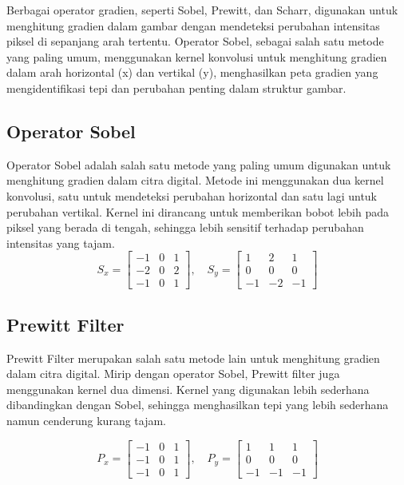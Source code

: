   Berbagai operator gradien, seperti Sobel, Prewitt, dan Scharr, digunakan untuk menghitung gradien dalam gambar dengan mendeteksi perubahan intensitas piksel di sepanjang arah tertentu. 
Operator Sobel, sebagai salah satu metode yang paling umum, menggunakan kernel konvolusi untuk menghitung gradien dalam arah horizontal (x) dan vertikal (y), menghasilkan peta gradien yang mengidentifikasi tepi dan perubahan penting dalam struktur gambar.
\subsection{Operator Sobel}
  Operator Sobel adalah salah satu metode yang paling umum digunakan untuk menghitung gradien dalam citra digital. Metode ini menggunakan dua kernel konvolusi, satu untuk mendeteksi perubahan horizontal dan satu lagi untuk perubahan vertikal. Kernel ini dirancang untuk memberikan bobot lebih pada piksel yang berada di tengah, sehingga lebih sensitif terhadap perubahan intensitas yang tajam.
  \begin{equation}
      S_x = \begin{bmatrix}
        -1 & 0 & 1 \\
        -2 & 0 & 2 \\
        -1 & 0 & 1
  \end{bmatrix}, \quad
      S_y = \begin{bmatrix}
        1 & 2 & 1 \\
        0 & 0 & 0 \\
        -1 & -2 & -1
  \end{bmatrix}
      \label{eq:sobel-kernel}
\end{equation}

  \subsection{Prewitt Filter}
    Prewitt Filter merupakan salah satu metode lain untuk menghitung gradien dalam citra digital.
  Mirip dengan operator Sobel, Prewitt filter juga menggunakan kernel dua dimensi. Kernel yang digunakan lebih sederhana dibandingkan dengan Sobel, sehingga menghasilkan tepi yang lebih sederhana namun cenderung kurang tajam.

\begin{equation*}
  P_x = \begin{bmatrix}
    -1 & 0 & 1 \\
    -1 & 0 & 1 \\
    -1 & 0 & 1
  \end{bmatrix}, \quad
  P_y = \begin{bmatrix}
    1 & 1 & 1 \\
    0 & 0 & 0 \\
    -1 & -1 & -1
  \end{bmatrix}
\end{equation*}

